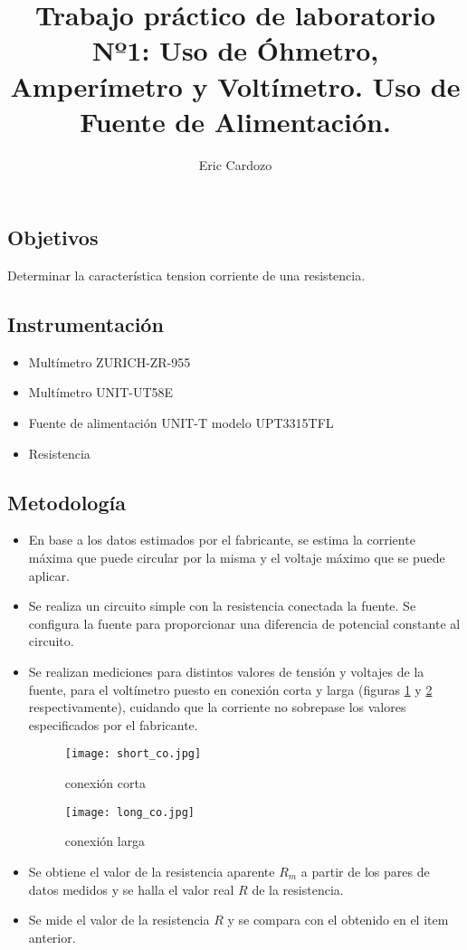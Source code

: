\documentclass[12pt,a4paper]{article}
\author{Eric Cardozo}
\title{Trabajo pr\'actico de laboratorio Nº1: Uso de Óhmetro, Amperímetro y Voltímetro.
Uso de Fuente de Alimentación.}
\begin{document}

\maketitle
\subsection*{Objetivos}
Determinar la característica tension corriente de una resistencia.

\subsection*{Instrumentación}

\begin{itemize}
\item Multímetro ZURICH-ZR-955
\item Multímetro UNIT-UT58E
\item Fuente de alimentación UNIT-T modelo UPT3315TFL
\item Resistencia
\end{itemize}

\subsection*{Metodología}
\begin{itemize}
\item En base a los datos estimados por el fabricante, se estima la corriente máxima que puede circular por la misma y el voltaje máximo que se puede aplicar.
\item Se realiza un circuito simple con la resistencia conectada la fuente. Se configura la fuente para proporcionar una diferencia de potencial constante al circuito.
\item Se realizan mediciones para distintos valores de tensi\'on y voltajes de la fuente, para el voltímetro puesto en conexión corta y larga (figuras \ref{sco} y \ref{lco} respectivamente), cuidando que la corriente no sobrepase los valores especificados por el fabricante.

\begin{figure}[H]
  \centering
   \texttt{[image: short\_co.jpg]}
\caption{conexión corta}
  \label{sco}
\end{figure}

\begin{figure}[H]
  \centering
   \texttt{[image: long\_co.jpg]}
\caption{conexión larga}
  \label{lco}
\end{figure}


\item Se obtiene el valor de la resistencia aparente $R_m$ a partir de los pares de datos medidos y se halla el valor real $R$ de la resistencia.
\item Se mide el valor de la resistencia $R$ y se compara con el obtenido en el item anterior. 
\end{itemize}
\end{document}
